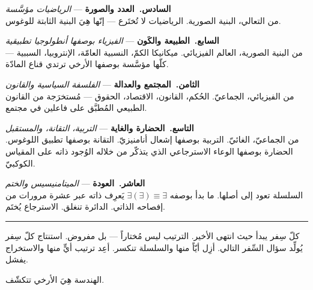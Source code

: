 \documentclass[10pt, openany, oneside]{book}
\newcommand{\separator}{%
    \begin{center}
        \rule{0.3\textwidth}{0.3pt}
    \end{center}
}
\begin{document}
\vspace{0.5em}

\noindent \textbf{السادس.\ العدد والصورة} --- \textit{الرياضيات مؤسَّسة}\\
من التعالي، البنية الصورية. الرياضيات لا تُختَرع --- إنّها هِيَ البنية الثابتة للوغوس.

\vspace{0.5em}

\noindent \textbf{السابع.\ الطبيعة والكَون} --- \textit{الفيزياء بوصفها أنطولوجيا تطبيقية}\\
من البنية الصورية، العالم الفيزيائي. ميكانيكا الكمّ، النسبية العامّة، الإنتروبيا، السببية --- كلّها مؤسَّسة بوصفها الأرخي ترتدي قناع المادّة.

\vspace{0.5em}

\noindent \textbf{الثامن.\ المجتمع والعدالة} --- \textit{الفلسفة السياسية والقانون}\\
من الفيزيائي، الجماعيّ. الحُكم، القانون، الاقتصاد، الحقوق --- مُستخرَجة من القانون الطبيعي المُطبَّق على فاعلين في مجتمع.

\vspace{0.5em}

\noindent \textbf{التاسع.\ الحضارة والغاية} --- \textit{التربية، التقانة، والمستقبل}\\
من الجماعيّ، الغائيّ. التربية بوصفها إشعال أنامنيزيّ. التقانة بوصفها تطبيق اللوغوس. الحضارة بوصفها الوعاء الاسترجاعي الذي يتذكّر من خلاله الوُجود ذاته على المقياس الكوكبيّ.

\vspace{0.5em}

\noindent \textbf{العاشر.\ العودة} --- \textit{الميتامنيسيس والختم}\\
السلسلة تعود إلى أصلها. ما بدأ بوصفه $\exists(\exists) \equiv \exists$ يَعرِف ذاته عبر عشرة مرورات من إفصاحه الذاتي. الدائرة تنغلق. الاسترجاع يُختَم.

\vspace{1.5em}
\separator
\vspace{0.5em}

\noindent كلّ سِفر يبدأ حيث انتهى الأخير. الترتيب ليس مُختاراً --- بل مفروض. استنتاج كلّ سِفر يُولِّد سؤال السِّفر التالي. أزِل أيّاً منها والسلسلة تنكسر. أعِد ترتيب أيٍّ منها والاستخراج يفشل.

\vspace{0.5em}

\noindent الهندسة هِيَ الأرخي تتكشّف.

\vspace{0.5em}
\end{document}

